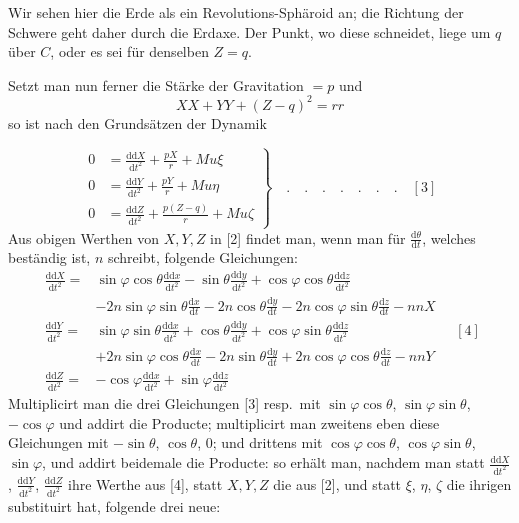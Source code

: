 Wir sehen hier die Erde als ein Revolutions-Sphäroid an; die Richtung der Schwere geht daher durch die Erdaxe. Der Punkt, wo diese schneidet, liege um $q$ über $C$, oder es sei für denselben $Z=q$.

Setzt man nun ferner die Stärke der Gravitation $=p$ und
\[
XX+YY+(Z-q)^2=rr
\]
so ist nach den Grundsätzen der Dynamik
\par\clearpage
{}
\[
\left.\begin{aligned}
0&=\frac{\mathrm{dd}X}{\mathrm{d}t^2}+\frac{pX}{r}+Mu\xi\\
0&=\frac{\mathrm{dd}Y}{\mathrm{d}t^2}+\frac{pY}{r}+Mu\eta\\
0&=\frac{\mathrm{dd}Z}{\mathrm{d}t^2}+\frac{p(Z-q)}{r}+Mu\zeta
\end{aligned}\right\}\quad.\quad.\quad.\quad.\quad.\quad.\quad.\quad[3]
\]
Aus obigen Werthen von $X,Y,Z$ in [2] findet man, wenn man für $\tfrac{\mathrm{d}\theta}{\mathrm{d}t}$, welches beständig ist, $n$ schreibt, folgende Gleichungen:
\[
\begin{aligned}
\frac{\mathrm{dd}X}{\mathrm{d}t^2}={}&\sin\varphi\cos\theta\frac{\mathrm{dd}x}{\mathrm{d}t^2}-\sin\theta\frac{\mathrm{dd}y}{\mathrm{d}t^2}+\cos\varphi\cos\theta\frac{\mathrm{dd}z}{\mathrm{d}t^2}\\
&-2n\sin\varphi\sin\theta\frac{\mathrm{d}x}{\mathrm{d}t}-2n\cos\theta\frac{\mathrm{d}y}{\mathrm{d}t}-2n\cos\varphi\sin\theta\frac{\mathrm{d}z}{\mathrm{d}t}-nnX\\[5pt]
\frac{\mathrm{dd}Y}{\mathrm{d}t^2}={}&\sin\varphi\sin\theta\frac{\mathrm{dd}x}{\mathrm{d}t^2}+\cos\theta\frac{\mathrm{dd}y}{\mathrm{d}t^2}+\cos\varphi\sin\theta\frac{\mathrm{dd}z}{\mathrm{d}t^2}\\
&+2n\sin\varphi\cos\theta\frac{\mathrm{d}x}{\mathrm{d}t}-2n\sin\theta\frac{\mathrm{d}y}{\mathrm{d}t}+2n\cos\varphi\cos\theta\frac{\mathrm{d}z}{\mathrm{d}t}-nnY\\[5pt]
\frac{\mathrm{dd}Z}{\mathrm{d}t^2}={}&-\cos\varphi\frac{\mathrm{dd}x}{\mathrm{d}t^2}+\sin\varphi\frac{\mathrm{dd}z}{\mathrm{d}t^2}
\end{aligned}\quad[4]
\]
Multiplicirt man die drei Gleichungen [3] resp.\ mit $\sin\varphi\cos\theta$, $\sin\varphi\sin\theta$, $-\cos\varphi$ und addirt die Producte; multiplicirt man zweitens eben diese Gleichungen mit $-\sin\theta$, $\cos\theta$, $0$; und drittens mit $\cos\varphi\cos\theta$, $\cos\varphi\sin\theta$, $\sin\varphi$, und addirt beidemale die Producte: so erhält man, nachdem man statt $\tfrac{\mathrm{dd}X}{\mathrm{d}t^2}$, $\tfrac{\mathrm{dd}Y}{\mathrm{d}t^2}$, $\tfrac{\mathrm{dd}Z}{\mathrm{d}t^2}$ ihre Werthe aus [4], statt $X,Y,Z$ die aus [2], und statt $\xi$, $\eta$, $\zeta$ die ihrigen substituirt hat, folgende drei neue:
